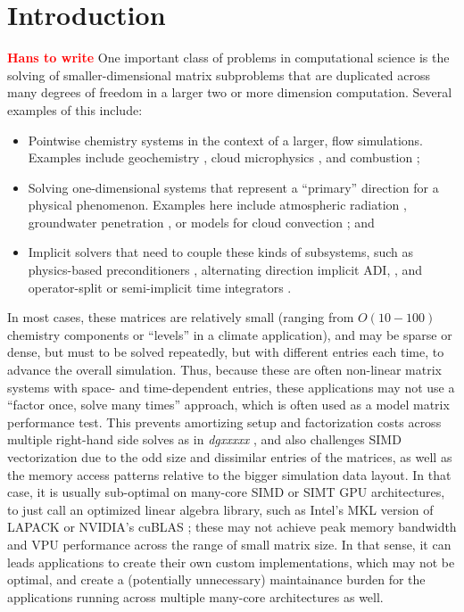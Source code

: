 \documentclass[conference]{IEEEtran}
\newcommand{\fix}[1]{{\bf \textcolor {red}{#1}}}
\begin{document}
\section{Introduction}
% 
\fix{Hans to write}
One important class of problems in computational science is the solving
  of smaller-dimensional matrix subproblems that are duplicated across
  many degrees of freedom in a larger two or more dimension computation.
Several examples of this include: 
\begin{itemize}
\item Pointwise chemistry systems in the context of a larger, 
  flow simulations. 
Examples include geochemistry \cite{??}, cloud microphysics \cite{??},
  and combustion \cite{??};
\item Solving one-dimensional systems that represent a ``primary''
  direction for a physical phenomenon.
Examples here include atmospheric radiation \cite{??}, groundwater
  penetration \cite{??}, or models for cloud convection \cite{??}; and
\item Implicit solvers that need to couple these kinds of subsystems, 
  such as physics-based preconditioners \cite{??}, alternating 
  direction implicit ADI, \cite{??}, and operator-split or
  semi-implicit time integrators \cite{??}.
\end{itemize}
In most cases, these matrices are relatively small 
  (ranging from $O(10-100)$ chemistry components or ``levels'' 
  in a climate application), and may be sparse or dense, but must 
  to be solved repeatedly, but with different entries each time, 
  to advance the overall simulation.
Thus, because these are often non-linear matrix systems with space- and 
  time-dependent entries, these applications may not use a 
  ``factor once, solve many times'' approach, which is often used 
  as a model matrix performance test.
This prevents amortizing setup and factorization costs
  across multiple right-hand side solves as in \emph{dgxxxxx} \cite{??},
  and also challenges SIMD vectorization due to the odd size and
  dissimilar entries of the matrices, as well as the 
  memory access patterns relative to the bigger simulation data layout.
In that case, it is usually sub-optimal on many-core SIMD 
  or SIMT GPU architectures,
  to just call an optimized linear algebra library, 
  such as Intel's MKL version of LAPACK \cite{??} or NVIDIA's
  cuBLAS \cite{??}; these may not achieve peak memory bandwidth 
  and VPU performance across the range of small matrix size. 
In that sense, it can leads applications to create their own 
  custom implementations, which may not be optimal, and create a 
  (potentially unnecessary) maintainance burden for the applications 
  running across multiple many-core architectures as well. 
  
\end{document}

